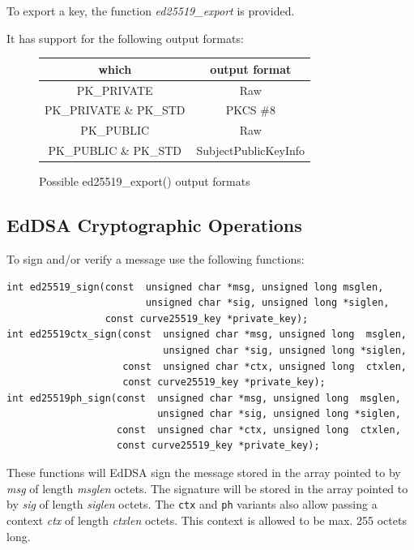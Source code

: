 \documentclass[synpaper]{book}
\begin{document}
To export a key, the function \textit{ed25519\_export} is provided.

It has support for the following output formats:

\begin{figure}[H]
\begin{center}
\begin{tabular}{|c|c|}
\hline \textbf{which} & \textbf{output format} \\
\hline PK\_PRIVATE & Raw \\
\hline PK\_PRIVATE \& PK\_STD & PKCS \#8 \\
\hline PK\_PUBLIC & Raw \\
\hline PK\_PUBLIC \& PK\_STD & SubjectPublicKeyInfo \\
\hline
\end{tabular}
\end{center}
\caption{Possible ed25519\_export() output formats}
\end{figure}

\subsection{EdDSA Cryptographic Operations}

To sign and/or verify a message use the following functions:

\begin{verbatim}
int ed25519_sign(const  unsigned char *msg, unsigned long msglen,
                        unsigned char *sig, unsigned long *siglen,
                 const curve25519_key *private_key);
int ed25519ctx_sign(const  unsigned char *msg, unsigned long  msglen,
                           unsigned char *sig, unsigned long *siglen,
                    const  unsigned char *ctx, unsigned long  ctxlen,
                    const curve25519_key *private_key);
int ed25519ph_sign(const  unsigned char *msg, unsigned long  msglen,
                          unsigned char *sig, unsigned long *siglen,
                   const  unsigned char *ctx, unsigned long  ctxlen,
                   const curve25519_key *private_key);
\end{verbatim}

These functions will EdDSA sign the message stored in the array pointed to by \textit{msg} of length \textit{msglen} octets.  The signature
will be stored in the array pointed to by \textit{sig} of length \textit{siglen} octets.  The \texttt{ctx} and \texttt{ph} variants also
allow passing a context \textit{ctx} of length \textit{ctxlen} octets.  This context is allowed to be max. 255 octets long.
\end{document}
